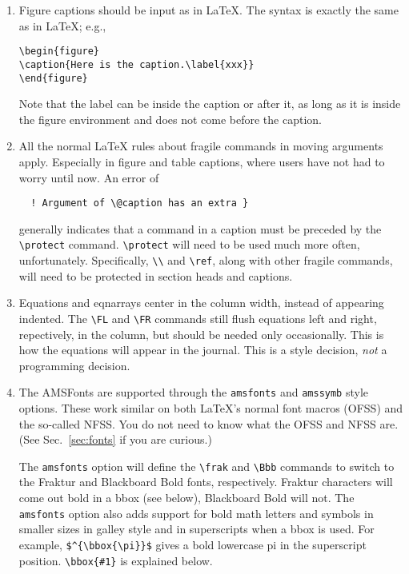 \begin{enumerate}
\item Figure captions should be input as in \LaTeX{}.
The syntax is exactly the same as in \LaTeX{}; e.g.,
\begin{verbatim}
\begin{figure}
\caption{Here is the caption.\label{xxx}}
\end{figure}
\end{verbatim}
Note that the label can be inside the caption or after it, as long as it is
inside the figure environment and does not come before the caption.

\item All the normal \LaTeX{} rules about fragile commands in moving
arguments apply. Especially in figure and table captions, where \REVTeX{}
users have not had to worry until now. An error of
\begin{verbatim}
  ! Argument of \@caption has an extra }
\end{verbatim}
generally indicates that a command in a caption must be preceded by
the \verb+\protect+ command.
\verb+\protect+ will need to be used much more often, unfortunately.
Specifically, \verb+\\+ and \verb+\ref+, along with other fragile commands,
will need to be protected in section heads and captions.

\item Equations and eqnarrays center in the column width, instead of
appearing indented. The \verb+\FL+ and \verb+\FR+ commands still flush
equations left and right, repectively, in the column, but should be needed
only occasionally. This is how the equations will appear in the journal.
This is a style decision, {\em not\/} a programming decision.

\item The AMSFonts are supported through the \verb+amsfonts+ and
\verb+amssymb+ style options.  These work similar on both \LaTeX's normal
font macros (OFSS) and the so-called NFSS. You do not need to know what the
OFSS and NFSS are. (See Sec.\ \ref{sec:fonts} if you are curious.)


The \verb+amsfonts+ option will define the \verb+\frak+ and \verb+\Bbb+
commands to switch to the Fraktur and Blackboard Bold fonts, respectively.
Fraktur characters will come out bold in a bbox (see below), Blackboard
Bold will not. The \verb+amsfonts+ option also adds support for bold math
letters and symbols in smaller sizes in galley style and in superscripts
when a bbox is used.  For example, \verb+$^{\bbox{\pi}}$+ gives a bold
lowercase pi in the superscript position. \verb+\bbox{#1}+ is explained
below.


\end{enumerate}

